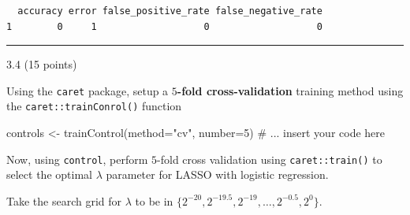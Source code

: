\documentclass[
  letterpaper,
  DIV=11,
  numbers=noendperiod]{scrartcl}
\newenvironment{Shaded}{\begin{snugshade}}{\end{snugshade}}
\newcommand{\AttributeTok}[1]{\textcolor[rgb]{0.40,0.45,0.13}{#1}}
\newcommand{\CommentTok}[1]{\textcolor[rgb]{0.37,0.37,0.37}{#1}}
\newcommand{\DecValTok}[1]{\textcolor[rgb]{0.68,0.00,0.00}{#1}}
\newcommand{\FloatTok}[1]{\textcolor[rgb]{0.68,0.00,0.00}{#1}}
\newcommand{\FunctionTok}[1]{\textcolor[rgb]{0.28,0.35,0.67}{#1}}
\newcommand{\NormalTok}[1]{\textcolor[rgb]{0.00,0.23,0.31}{#1}}
\newcommand{\OtherTok}[1]{\textcolor[rgb]{0.00,0.23,0.31}{#1}}
\newcommand{\SpecialCharTok}[1]{\textcolor[rgb]{0.37,0.37,0.37}{#1}}
\newcommand{\StringTok}[1]{\textcolor[rgb]{0.13,0.47,0.30}{#1}}
\begin{document}
\begin{verbatim}
  accuracy error false_positive_rate false_negative_rate
1        0     1                   0                   0
\end{verbatim}

\begin{center}\rule{0.5\linewidth}{0.5pt}\end{center}

3.4 (15 points)

Using the \texttt{caret} package, setup a \textbf{\(5\)-fold
cross-validation} training method using the
\texttt{caret::trainConrol()} function

\begin{Shaded}
\begin{Highlighting}[]
\NormalTok{controls }\OtherTok{\textless{}{-}} \FunctionTok{trainControl}\NormalTok{(}\AttributeTok{method=}\StringTok{"cv"}\NormalTok{, }\AttributeTok{number=}\DecValTok{5}\NormalTok{) }\CommentTok{\# ... insert your code here}
\end{Highlighting}
\end{Shaded}

Now, using \texttt{control}, perform \(5\)-fold cross validation using
\texttt{caret::train()} to select the optimal \(\lambda\) parameter for
LASSO with logistic regression.

Take the search grid for \(\lambda\) to be in
\(\{ 2^{-20}, 2^{-19.5}, 2^{-19}, \dots, 2^{-0.5}, 2^{0} \}\).

\begin{Shaded}
\end{Shaded}
\end{document}
